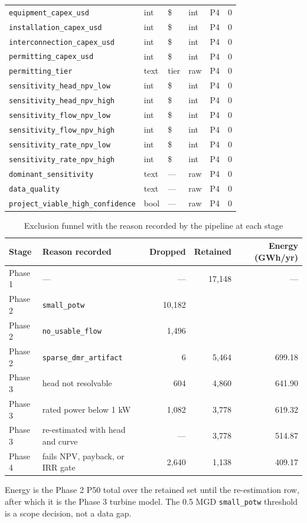 \documentclass[12pt,letterpaper]{report}
\begin{document}
\begin{longtable}{@{}lllllr@{}}
\texttt{equipment\_capex\_usd} & int & \$ & int & P4 & 0 \\
\texttt{installation\_capex\_usd} & int & \$ & int & P4 & 0 \\
\texttt{interconnection\_capex\_usd} & int & \$ & int & P4 & 0 \\
\texttt{permitting\_capex\_usd} & int & \$ & int & P4 & 0 \\
\texttt{permitting\_tier} & text & tier & raw & P4 & 0 \\
\texttt{sensitivity\_head\_npv\_low} & int & \$ & int & P4 & 0 \\
\texttt{sensitivity\_head\_npv\_high} & int & \$ & int & P4 & 0 \\
\texttt{sensitivity\_flow\_npv\_low} & int & \$ & int & P4 & 0 \\
\texttt{sensitivity\_flow\_npv\_high} & int & \$ & int & P4 & 0 \\
\texttt{sensitivity\_rate\_npv\_low} & int & \$ & int & P4 & 0 \\
\texttt{sensitivity\_rate\_npv\_high} & int & \$ & int & P4 & 0 \\
\texttt{dominant\_sensitivity} & text & --- & raw & P4 & 0 \\
\texttt{data\_quality} & text & --- & raw & P4 & 0 \\
\texttt{project\_viable\_high\_confidence} & bool & --- & raw & P4 & 0 \\
\end{longtable}
\endgroup

\begin{table}[htbp]
\centering
\caption{Exclusion funnel with the reason recorded by the pipeline at each stage}
\label{tab:funnel_full}
\footnotesize
\begin{tabular}{@{}llrrr@{}}
\toprule
Stage & Reason recorded & Dropped & Retained & Energy (GWh/yr) \\
\midrule
Phase 1 & ---                              & ---       & 17{,}148 & --- \\
Phase 2 & \texttt{small\_potw}             & 10{,}182  &          &     \\
Phase 2 & \texttt{no\_usable\_flow}        & 1{,}496   &          &     \\
Phase 2 & \texttt{sparse\_dmr\_artifact}   & 6         & 5{,}464  & 699.18 \\
Phase 3 & head not resolvable              & 604       & 4{,}860  & 641.90 \\
Phase 3 & rated power below 1 kW           & 1{,}082   & 3{,}778  & 619.32 \\
Phase 3 & re-estimated with head and curve & ---       & 3{,}778  & 514.87 \\
Phase 4 & fails NPV, payback, or IRR gate  & 2{,}640   & 1{,}138  & 409.17 \\
\bottomrule
\end{tabular}

\vspace{0.4em}
{\footnotesize Energy is the Phase 2 P50 total over the retained set until the
re-estimation row, after which it is the Phase 3 turbine model. The 0.5 MGD
\texttt{small\_potw} threshold is a scope decision, not a data gap.}
\end{table}
\end{document}
